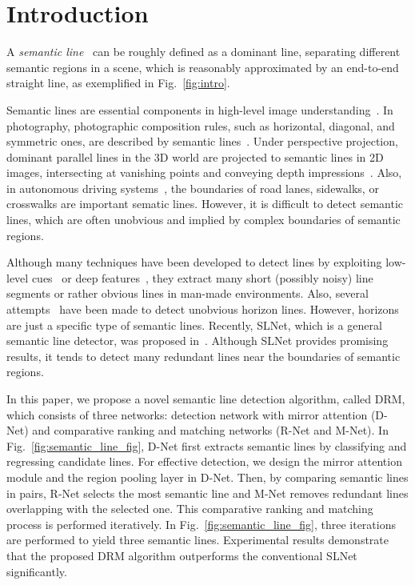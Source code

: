 \documentclass[runningheads]{llncs}
\begin{document}
\section{Introduction}
A \textit{semantic line}~\cite{lee2017} can be roughly defined as a dominant line, separating different semantic regions in a scene, which is reasonably approximated by an end-to-end straight line, as exemplified in Fig.~\ref{fig:intro}.

Semantic lines are essential components in high-level image understanding~\cite{Freeman2007,lee2018photographic,guo2012,hillel2014,zhou2017,zhou2019_nips}. In photography, photographic composition rules, such as horizontal, diagonal, and symmetric ones, are described by semantic lines~\cite{Freeman2007,lee2018photographic}. Under perspective projection, dominant parallel lines in the 3D world are projected to semantic lines in 2D images, intersecting at vanishing points and conveying depth impressions~\cite{zhou2017}. Also, in autonomous driving systems~\cite{guo2012,hillel2014}, the boundaries of road lanes, sidewalks, or crosswalks are important sematic lines. However, it is difficult to detect semantic lines, which are often unobvious and implied by complex boundaries of semantic regions.

Although many techniques have been developed to detect lines by exploiting low-level cues~\cite{matas2000,von2008,desolneux200,akinlar2011} or deep features~\cite{huang2018,xue2019,zhou2019_line}, they extract many short (possibly noisy) line segments or rather obvious lines in man-made environments. Also, several attempts~\cite{workman2016,zhai2016,koo2013} have been made to detect unobvious horizon lines. However, horizons are just a specific type of semantic lines.  Recently, SLNet, which is a general semantic line detector, was proposed in~\cite{lee2017}. Although SLNet provides promising results, it tends to detect many redundant lines near the boundaries of semantic regions.

In this paper, we propose a novel semantic line detection algorithm, called DRM, which consists of three networks: detection network with mirror attention (D-Net) and comparative ranking and matching networks (R-Net and M-Net). In Fig.~\ref{fig:semantic_line_fig}, D-Net first extracts semantic lines by classifying and regressing candidate lines. For effective detection, we design the mirror attention module and the region pooling layer in D-Net. Then, by comparing semantic lines in pairs, R-Net selects the most semantic line and M-Net removes redundant lines overlapping with the selected one. This comparative ranking and matching process is performed iteratively. In Fig.~\ref{fig:semantic_line_fig}, three iterations are performed to yield three semantic lines. Experimental results demonstrate that the proposed DRM algorithm outperforms the conventional SLNet~\cite{lee2017} significantly.
\end{document}
